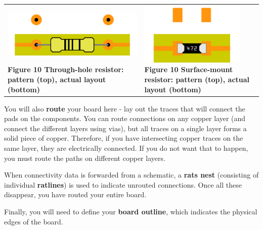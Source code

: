\documentclass[letterpaper]{article}
\begin{document}
\begin{flushleft}
\tablefirsthead{}
\tablehead{}
\tabletail{}
\tablelasttail{}
\begin{supertabular}{m{3.7275598in}m{3.6150599in}}
 \includegraphics[width=3.5409in,height=1.1772in]{figures/ee4document-img013.png} 
{\sffamily\bfseries\color[rgb]{0.30980393,0.5058824,0.7411765} Figure 10 Through-hole resistor:
pattern (top), actual layout (bottom)} &
 \includegraphics[width=1.9681in,height=1.1772in]{figures/ee4document-img014.png} 
{\sffamily\bfseries\color[rgb]{0.30980393,0.5058824,0.7411765} Figure 10 Surface-mount resistor:
pattern (top), actual layout (bottom)}\\
\end{supertabular}
\end{flushleft}
{\sffamily\color[rgb]{0.30980393,0.5058824,0.7411765}
You will also \textbf{route} your board here - lay out the traces that will connect the pads on the components. You can
route connections on any copper layer (and connect the different layers using vias), but all traces on a single layer
forms a solid piece of copper. Therefore, if you have intersecting copper traces on the same layer, they are
electrically connected. If you do not want that to happen, you must route the paths on different copper layers.}


\bigskip

{\sffamily\color[rgb]{0.30980393,0.5058824,0.7411765}
When connectivity data is forwarded from a schematic, a \textbf{rats nest} (consisting of individual \textbf{ratlines})
is used to indicate unrouted connections. Once all these disappear, you have routed your entire board.}


\bigskip

{\sffamily\color[rgb]{0.30980393,0.5058824,0.7411765}
Finally, you will need to define your \textbf{board outline}, which indicates the physical edges of the board.}
\end{document}
